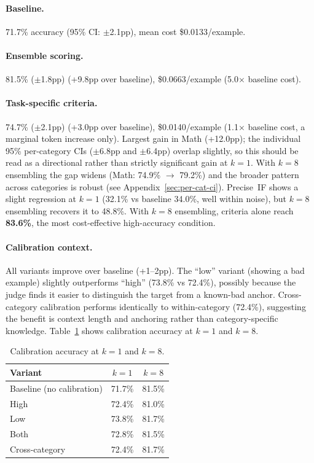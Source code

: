 \documentclass{article}
\begin{document}
\paragraph{Baseline.} 71.7\% accuracy (95\% CI: $\pm$2.1pp), mean cost \$0.0133/example.

\paragraph{Ensemble scoring.} 81.5\% ($\pm$1.8pp) (+9.8pp over baseline), \$0.0663/example (5.0$\times$ baseline cost).

\paragraph{Task-specific criteria.} 74.7\% ($\pm$2.1pp) (+3.0pp over baseline), \$0.0140/example (1.1$\times$ baseline cost, a marginal token increase only). Largest gain in Math (+12.0pp); the individual 95\% per-category CIs ($\pm$6.8pp and $\pm$6.4pp) overlap slightly, so this should be read as a directional rather than strictly significant gain at $k{=}1$. With $k{=}8$ ensembling the gap widens (Math: 74.9\% $\to$ 79.2\%) and the broader pattern across categories is robust (see Appendix~\ref{sec:per-cat-ci}). Precise~IF shows a slight regression at $k{=}1$ (32.1\% vs baseline 34.0\%, well within noise), but $k{=}8$ ensembling recovers it to 48.8\%. With $k{=}8$ ensembling, criteria alone reach \textbf{83.6\%}, the most cost-effective high-accuracy condition.

\paragraph{Calibration context.} All variants improve over baseline (+1--2pp). The ``low'' variant (showing a bad example) slightly outperforms ``high'' (73.8\% vs 72.4\%), possibly because the judge finds it easier to distinguish the target from a known-bad anchor. Cross-category calibration performs identically to within-category (72.4\%), suggesting the benefit is context length and anchoring rather than category-specific knowledge. Table~\ref{tab:cal-results} shows calibration accuracy at $k{=}1$ and $k{=}8$.

\begin{table}[ht]
\centering
\caption{Calibration accuracy at $k{=}1$ and $k{=}8$.}
\label{tab:cal-results}
\begin{tabular}{lcc}
\toprule
Variant & $k{=}1$ & $k{=}8$ \\
\midrule
Baseline (no calibration) & 71.7\% & 81.5\% \\
High           & 72.4\% & 81.0\% \\
Low            & 73.8\% & 81.7\% \\
Both           & 72.8\% & 81.5\% \\
Cross-category & 72.4\% & 81.7\% \\
\bottomrule
\end{tabular}
\end{table}
\end{document}
